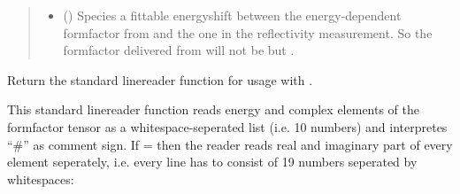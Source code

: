 \documentclass[letterpaper,10pt,english]{sphinxmanual}
\begin{document}
\begin{fulllineitems}
\begin{fulllineitems}
\begin{quote}
\begin{description}
\begin{itemize}
\item {} 
 ({\hyperref[\detokenize{modules-api/parameters:Parameters.Parameter}]{}}) \textendash{} Species a fittable energyshift between the energy-dependent formfactor from  and the  one in the reflectivity measurement.
So the formfactor delivered from {\hyperref[\detokenize{modules-api/samplerepresentation:SampleRepresentation.FFfromFile.getFF}]{}} will not be  but .

\end{itemize}

\end{description}\end{quote}

\end{fulllineitems}


\begin{fulllineitems}
\label{\detokenize{modules-api/samplerepresentation:SampleRepresentation.FFfromFile.createLinereader}}
Return the standard linereader function for usage with {\hyperref[\detokenize{modules-api/samplerepresentation:SampleRepresentation.FFfromFile.__init__}]{}}.

This standard linereader function reads energy and complex elements of the formfactor tensor as a whitespace-seperated list (i.e. 10 numbers) and interpretes “\#” as comment sign.
If  =  then the reader reads real and imaginary part of every element seperately, i.e. every line has to consist of 19 numbers seperated by whitespaces:

%
\begin{sphinxVerbatim}[commandchars=\\\{\}]
       
\end{sphinxVerbatim}


\end{fulllineitems}
\end{fulllineitems}
\end{document}
